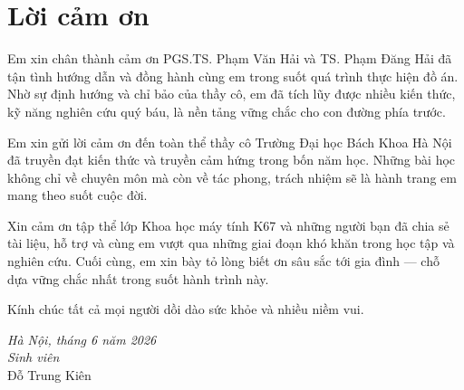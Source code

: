 \chapter*{Lời cảm ơn}

Em xin chân thành cảm ơn PGS.TS. Phạm Văn Hải và TS. Phạm Đăng Hải đã tận tình hướng dẫn và đồng hành cùng em trong suốt quá trình thực hiện đồ án. Nhờ sự định hướng và chỉ bảo của thầy cô, em đã tích lũy được nhiều kiến thức, kỹ năng nghiên cứu quý báu, là nền tảng vững chắc cho con đường phía trước.

Em xin gửi lời cảm ơn đến toàn thể thầy cô Trường Đại học Bách Khoa Hà Nội đã truyền đạt kiến thức và truyền cảm hứng trong bốn năm học. Những bài học không chỉ về chuyên môn mà còn về tác phong, trách nhiệm sẽ là hành trang em mang theo suốt cuộc đời.

Xin cảm ơn tập thể lớp Khoa học máy tính K67 và những người bạn đã chia sẻ tài liệu, hỗ trợ và cùng em vượt qua những giai đoạn khó khăn trong học tập và nghiên cứu. Cuối cùng, em xin bày tỏ lòng biết ơn sâu sắc tới gia đình --- chỗ dựa vững chắc nhất trong suốt hành trình này.

\vspace{0.6cm}
\noindent Kính chúc tất cả mọi người dồi dào sức khỏe và nhiều niềm vui.

\vspace{0.6cm}
\begin{flushright}
\textit{Hà Nội, tháng 6 năm 2026}\\[6pt]
\textit{Sinh viên}\\[28pt]
Đỗ Trung Kiên
\end{flushright}
